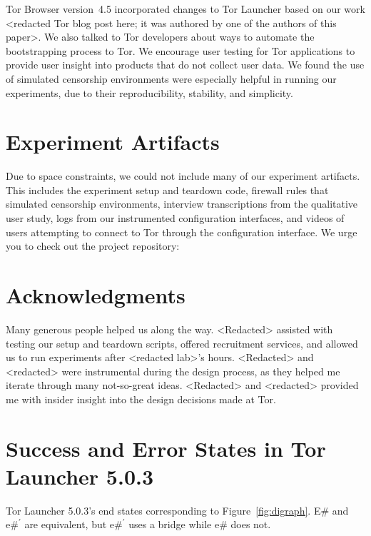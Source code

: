 \documentclass[USenglish,oneside,twocolumn]{article}
\begin{document}
Tor Browser version~4.5 incorporated changes to Tor Launcher based on our work <redacted Tor blog post here; it was authored by one of the authors of this paper>. We also talked to Tor developers about ways to automate the bootstrapping process to Tor. We encourage user testing for Tor applications to provide user insight into products that do not collect user data. We found the use of simulated censorship environments were especially helpful in running our experiments, due to their reproducibility, stability, and simplicity.

\section {Experiment Artifacts} 
Due to space constraints, we could not include many of our experiment artifacts. This includes the experiment setup and teardown code, firewall rules that simulated censorship environments, interview transcriptions from the qualitative user study, logs from our instrumented configuration interfaces, and videos of users attempting to connect to Tor through the configuration interface. We urge you to check out the project repository: \\


\section {Acknowledgments}
Many generous people helped us along the way. <Redacted> assisted with testing our setup and teardown scripts, offered recruitment services, and allowed us to run experiments after <redacted lab>'s hours. <Redacted> and <redacted> were instrumental during the design process, as they helped me iterate through many not-so-great ideas.  <Redacted> and <redacted> provided me with insider insight into the design decisions made at Tor.




\appendix

\section{Success and Error States in Tor Launcher 5.0.3} 
\label{states} 
Tor Launcher 5.0.3's end states corresponding to Figure~\ref{fig:digraph}. E\# and $\mbox{e\#}^\prime$ are equivalent, but $\mbox{e\#}^\prime$ uses a bridge while e\# does not. \\
\end{document}
